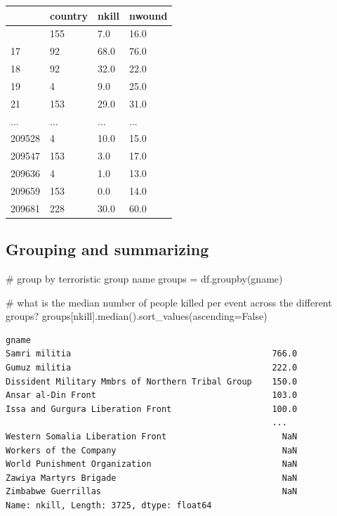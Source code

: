 \documentclass[
  letterpaper,
  DIV=11,
  numbers=noendperiod]{scrreprt}
\newenvironment{Shaded}{\begin{snugshade}}{\end{snugshade}}
\newcommand{\CommentTok}[1]{\textcolor[rgb]{0.37,0.37,0.37}{#1}}
\newcommand{\NormalTok}[1]{\textcolor[rgb]{0.00,0.23,0.31}{#1}}
\newcommand{\OperatorTok}[1]{\textcolor[rgb]{0.37,0.37,0.37}{#1}}
\newcommand{\StringTok}[1]{\textcolor[rgb]{0.13,0.47,0.30}{#1}}
\newcommand{\VariableTok}[1]{\textcolor[rgb]{0.07,0.07,0.07}{#1}}
\begin{document}
\begin{longtable}[]{@{}llll@{}}
\toprule\noalign{}
& country & nkill & nwound \\
\midrule\noalign{}
\endhead
\bottomrule\noalign{}
\endlastfoot
7 & 155 & 7.0 & 16.0 \\
17 & 92 & 68.0 & 76.0 \\
18 & 92 & 32.0 & 22.0 \\
19 & 4 & 9.0 & 25.0 \\
21 & 153 & 29.0 & 31.0 \\
... & ... & ... & ... \\
209528 & 4 & 10.0 & 15.0 \\
209547 & 153 & 3.0 & 17.0 \\
209636 & 4 & 1.0 & 13.0 \\
209659 & 153 & 0.0 & 14.0 \\
209681 & 228 & 30.0 & 60.0 \\
\end{longtable}

\subsection{Grouping and summarizing}\label{grouping-and-summarizing}

\begin{Shaded}
\begin{Highlighting}[]
\CommentTok{\# group by terroristic group name}
\NormalTok{groups }\OperatorTok{=}\NormalTok{ df.groupby(}\StringTok{\textquotesingle{}gname\textquotesingle{}}\NormalTok{)}
\end{Highlighting}
\end{Shaded}

\begin{Shaded}
\begin{Highlighting}[]
\CommentTok{\# what is the median number of people killed per event across the different groups?}
\NormalTok{groups[}\StringTok{\textquotesingle{}nkill\textquotesingle{}}\NormalTok{].median().sort\_values(ascending}\OperatorTok{=}\VariableTok{False}\NormalTok{)}
\end{Highlighting}
\end{Shaded}

\begin{verbatim}
gname
Samri militia                                        766.0
Gumuz militia                                        222.0
Dissident Military Mmbrs of Northern Tribal Group    150.0
Ansar al-Din Front                                   103.0
Issa and Gurgura Liberation Front                    100.0
                                                     ...  
Western Somalia Liberation Front                       NaN
Workers of the Company                                 NaN
World Punishment Organization                          NaN
Zawiya Martyrs Brigade                                 NaN
Zimbabwe Guerrillas                                    NaN
Name: nkill, Length: 3725, dtype: float64
\end{verbatim}
\end{document}
